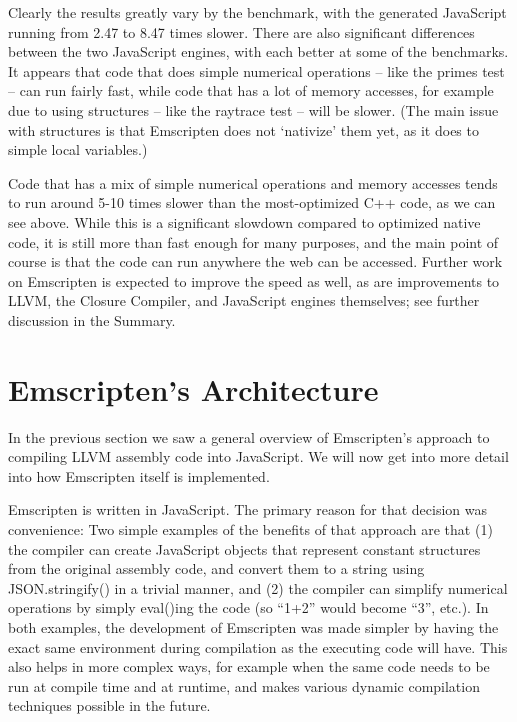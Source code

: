 \documentclass[preprint,10pt]{sigplanconf}
\begin{document}
Clearly the results greatly vary by the benchmark, with the generated JavaScript running from 2.47 to 8.47 times
slower. There are also significant differences between the two JavaScript engines, with each better
at some of the benchmarks.
It appears that code that does simple numerical operations -- like
the primes test -- can run fairly fast, while code that has a lot of memory
accesses, for example due to using structures -- like the raytrace test --
will be slower. (The main issue with structures is that Emscripten does not
`nativize' them yet, as it does to simple local variables.)

Code that has a mix of simple numerical operations and memory accesses
tends to run around 5-10 times slower than the most-optimized C++ code,
as we can see above. While this is a significant slowdown compared to
optimized native code, it is still more than fast enough for
many purposes, and the main point of course is that the code can run
anywhere the web can be accessed. Further work on Emscripten is expected to
improve the speed as well, as are improvements to LLVM, the Closure
Compiler, and JavaScript engines themselves; see further discussion
in the Summary.

\section{Emscripten's Architecture}
\label{sec:emarch}

In the previous section we saw a general overview of Emscripten's approach
to compiling LLVM assembly code into JavaScript. We will now get into more detail
into how Emscripten itself is implemented.

Emscripten is written in JavaScript. The primary reason for that decision
was convenience: Two simple examples of the benefits of that approach are that (1)
the compiler can create JavaScript objects that represent constant structures from the original
assembly code, and convert them to a string using JSON.stringify()
in a trivial manner,
and (2) the compiler can simplify numerical operations by simply
eval()ing the code (so ``1+2'' would become ``3'', etc.). In both examples,
the development of Emscripten was made simpler by having the exact same environment
during compilation as the executing code will have. This also helps in more
complex ways, for example when the same code needs to be run at compile time
and at runtime, and makes various dynamic compilation techniques possible in the future.
\end{document}
